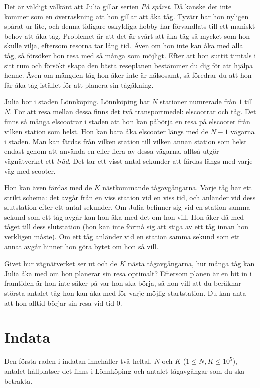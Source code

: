 \noindent
Det är väldigt välkänt att Julia gillar serien \textit{På spåret}. Då kanske det inte kommer som en
överraskning att hon gillar att åka tåg. Tyvärr har hon nyligen spårat ur lite, och denna
tidigare oskyldiga hobby har förvandlats till ett maniskt behov att åka tåg. Problemet är att
det är svårt att åka tåg så mycket som hon skulle vilja, eftersom resorna tar lång tid.
Även om hon inte kan åka med alla tåg, så försöker hon resa med så många som möjligt.
Efter att hon suttit timtals i sitt rum och försökt skapa den bästa reseplanen bestämmer
du dig för att hjälpa henne. Även om mängden tåg hon åker inte är hälsosamt, så föredrar
du att hon får åka tåg istället för att planera sin tågåkning.

Julia bor i staden Lönnköping. Lönnköping har $N$ stationer numrerade från $1$ till $N$.
För att resa mellan dessa finns det två transportmedel: elscootrar och tåg. Det finns
så många elscootrar i staden att hon kan påbörja en resa på elscooter från vilken station som helst.
Hon kan bara åka elscooter längs med de $N-1$ vägarna i staden. Man kan färdas från
vilken station till vilken annan station som helst endast genom att använda en eller flera av dessa vägarna,
alltså utgör vägnätverket ett \textit{träd}. Det tar ett visst antal sekunder att färdas längs med varje väg
med scooter. 

Hon kan även färdas med de $K$ nästkommande tågavgångarna. Varje tåg har ett strikt schema:
det avgår från en viss station vid en viss tid, och anländer vid dess slutstation efter ett antal sekunder.
Om Julia befinner sig vid en station samma sekund som ett tåg avgår kan hon åka med det om hon vill. Hon
åker då med tåget till dess slutstation (hon kan inte förmå sig att stiga av ett tåg innan hon verkligen måste).
Om ett tåg anländer vid en station samma sekund som ett annat avgår hinner hon göra bytet om hon så vill.

Givet hur vägnätverket ser ut och de $K$ nästa tågavgångarna, hur många tåg kan Julia åka
med om hon planerar sin resa optimalt? Eftersom planen är en bit in i framtiden är hon inte
säker på var hon ska börja, så hon vill att du beräknar största antalet tåg hon kan åka
med för varje möjlig startstation. Du kan anta att hon alltid börjar sin resa vid tid $0$.


\section*{Indata}
Den första raden i indatan innehåller två heltal, $N$ och $K$ ($1 \le N, K \le 10^5$), antalet hållplatser
det finns i Lönnköping och antalet tågavgångar som du ska betrakta.

